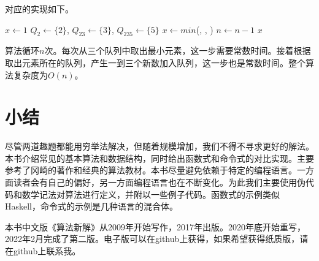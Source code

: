\documentclass[b5paper]{ctexart}
\begin{document}
对应的实现如下。

\begin{algorithmic}[1]
  \State $x \gets 1$
  \State $Q_2 \gets \{ 2 \}$, $Q_{23} \gets \{ 3 \}$, $Q_{235} \gets \{ 5 \}$
    \State $x \gets min$(, , )
      \State {}
      \State {}
      \State {}
      \State {}
      \State {}
      \State {}
      \State {}
    \Else
      \State {}
      \State {}
    \EndIf
    \State $n \gets n - 1$
  \EndWhile
  \State \Return $x$
\EndFunction
\end{algorithmic}

算法循环$n$次。每次从三个队列中取出最小元素，这一步需要常数时间。接着根据取出元素所在的队列，产生一到三个新数加入队列，这一步也是常数时间。整个算法复杂度为$O(n)$。

\section*{小结}
尽管两道趣题都能用穷举法解决，但随着规模增加，我们不得不寻求更好的解法。本书介绍常见的基本算法和数据结构，同时给出函数式和命令式的对比实现。主要参考了冈崎的著作\cite{okasaki-book}和经典的算法教材\cite{CLRS}。本书尽量避免依赖于特定的编程语言。一方面读者会有自己的偏好，另一方面编程语言也在不断变化。为此我们主要使用伪代码和数学记法对算法进行定义，并附以一些例子代码。函数式的示例类似Haskell，命令式的示例是几种语言的混合体。

本书中文版《算法新解》从2009年开始写作，2017年出版。2020年底开始重写，2022年2月完成了第二版。电子版可以在github上获得，如果希望获得纸质版，请在github上联系我。
\end{document}
